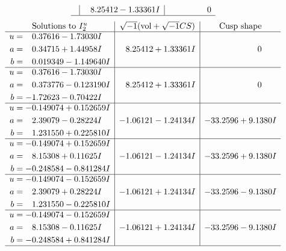 \documentclass[1p]{elsarticle_modified}
\theoremstyle{definition}
\newcommand{\I}{\sqrt{-1}}
\begin{document}
$$\begin{array}{c|c|c}
 & \phantom{-}8.25412 - 1.33361 I & \phantom{-0.000000 } 0\\
 \hline 
 \end{array}$$\newpage$$\begin{array}{c|c|c}  
\text{Solutions to }I^u_{2}& \I (\text{vol} + \sqrt{-1}CS) & \text{Cusp shape}\\
 \hline 
\begin{aligned}
u &= \phantom{-}0.37616 - 1.73030 I \\
a &= \phantom{-}0.34715 + 1.44958 I \\
b &= \phantom{-}0.019349 - 1.149640 I\end{aligned}
 & \phantom{-}8.25412 + 1.33361 I & \phantom{-0.000000 } 0 \\ \hline\begin{aligned}
u &= \phantom{-}0.37616 - 1.73030 I \\
a &= \phantom{-}0.373776 - 0.123190 I \\
b &= -1.72623 - 0.70422 I\end{aligned}
 & \phantom{-}8.25412 + 1.33361 I & \phantom{-0.000000 } 0 \\ \hline\begin{aligned}
u &= -0.149074 + 0.152659 I \\
a &= \phantom{-}2.39079 - 0.28224 I \\
b &= \phantom{-}1.231550 + 0.225810 I\end{aligned}
 & -1.06121 - 1.24134 I & -33.2596 + 9.1380 I \\ \hline\begin{aligned}
u &= -0.149074 + 0.152659 I \\
a &= \phantom{-}8.15308 + 0.11625 I \\
b &= -0.248584 - 0.841284 I\end{aligned}
 & -1.06121 - 1.24134 I & -33.2596 + 9.1380 I \\ \hline\begin{aligned}
u &= -0.149074 - 0.152659 I \\
a &= \phantom{-}2.39079 + 0.28224 I \\
b &= \phantom{-}1.231550 - 0.225810 I\end{aligned}
 & -1.06121 + 1.24134 I & -33.2596 - 9.1380 I \\ \hline\begin{aligned}
u &= -0.149074 - 0.152659 I \\
a &= \phantom{-}8.15308 - 0.11625 I \\
b &= -0.248584 + 0.841284 I\end{aligned}
 & -1.06121 + 1.24134 I & -33.2596 - 9.1380 I\\
 \hline 
 \end{array}$$\newpage\newpage\renewcommand{\arraystretch}{1}
\end{document}
